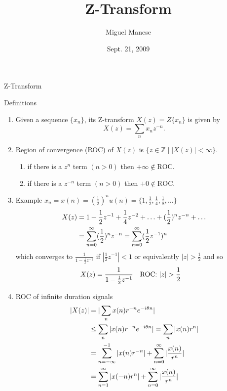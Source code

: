 \documentclass{article}
\title{Z-Transform}
\author{Miguel Manese}
\date{Sept. 21, 2009}
\newcommand{\field}[1]{\mathbb{#1}} %
\begin{document}
\maketitle

\begin{section}{Z-Transform}
\begin{subsection}{Definitions}
\begin{enumerate}
\item Given a sequence $\{x_{n}\}$, its Z-transform $X(z) = Z\{x_{n}\}$ is 
given by 
  \[ X(z) = \sum_{n} x_{n} z^{-n}. \]
\item Region of convergence (ROC) of $X(z)$ is $\{z \in \field{Z} \mid |X(z)| < 
\infty \}$.
  \begin{enumerate}
  \item if there is a $z^{n}$ term $(n > 0)$ then $+\infty \not\in \text{ROC}$.
  \item if there is a $z^{-n}$ term $(n > 0)$ then $+0 \not\in \text{ROC}$.
  \end{enumerate}
\item Example $x_{n} = x(n) = (\frac{1}{2})^{n} u(n) = \{1, \frac{1}{2},
 \frac{1}{4}, \frac{1}{8}, \ldots \}$
  \begin{align}
  X(z) &= 1 + \frac{1}{2}z^{-1} + \frac{1}{4}z^{-2} + \ldots +
              (\frac{1}{2})^{n} z^{-n} + \ldots \notag\\
       &= \sum_{n=0}^{\infty} (\frac{1}{2})^{n} z^{-n} 
        = \sum_{n=0}^{\infty} (\frac{1}{2} z^{-1})^{n}\notag 
  \end{align}
  which converges to $\frac{1}{1 - \frac{1}{2}z^{-1}}$ if 
  $|\frac{1}{2} z^{-1}| < 1$ or equivalently $|z| > \frac{1}{2}$ and so
  \begin{align}
  X(z) &= \frac{1}{1 - \frac{1}{2}z^{-1}} && \text{ROC: } |z| > \frac{1}{2}
   \notag
  \end{align}
\item ROC of infinite duration signals
  \begin{align}
  |X(z)| &= |\sum_{n} x(n)r^{-n} e^{-i\theta n}| \notag\\
         &\leq \sum_{n} |x(n) r^{-n} e^{-i\theta n}| 
           = \sum_{n} |x(n) r^{n}|\notag\\
         &= \sum_{n= -\infty}^{-1} |x(n) r^{-n}| +
            \sum_{n=0}^{\infty} |\frac{x(n)}{r^{n}}| \notag\\
         &= \sum_{n=1}^{\infty} |x(-n) r^{n}| +
            \sum_{n=0}^{\infty} |\frac{x(n)}{r^{n}}|\notag
  \end{align}

\end{enumerate}
\end{subsection}
\end{section}
\end{document}
